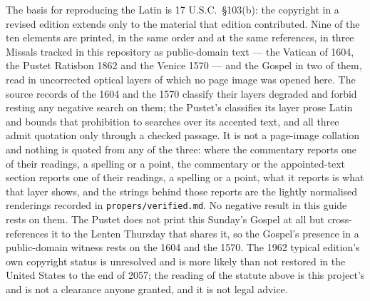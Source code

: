 The basis for reproducing the Latin is 17 U.S.C.\ §103(b): the copyright in a
revised edition extends only to the material that edition contributed. Nine of
the ten elements are printed, in the same order and at the same references, in
three Missals tracked in this repository as public-domain text --- the Vatican
 of 1604, the Pustet Ratisbon 1862 and the Venice 1570 --- and the
Gospel in two of them, read in
uncorrected optical layers of which no page image was opened here. The source
records of the 1604 and the 1570 classify their layers degraded and forbid
resting any negative search on them; the Pustet's classifies its layer prose
Latin and bounds that prohibition to searches over its accented text, and all
three admit quotation only through a checked passage. It is not a
page-image collation and
nothing is quoted from any of the three: where
\ifdefined\TriptychSynthesisEdition
the commentary reports one of their readings, a spelling or a point,%
\else
the commentary or the
appointed-text section reports one of their readings, a spelling or a point,%
\fi{}
what it reports is what that layer shows, and the strings behind those reports
are the lightly normalised renderings recorded in \texttt{propers/verified.md}.
No negative result in this guide rests on them. The Pustet does not print this
Sunday's Gospel at all but cross-references it to the Lenten Thursday that
shares it, so the Gospel's presence in a public-domain witness rests on the 1604
and the 1570. The 1962 typical edition's own copyright status is unresolved and
is more likely than not restored in the United States to the end of 2057; the
reading of the statute above is this project's and is not a clearance anyone
granted, and it is not legal advice.

